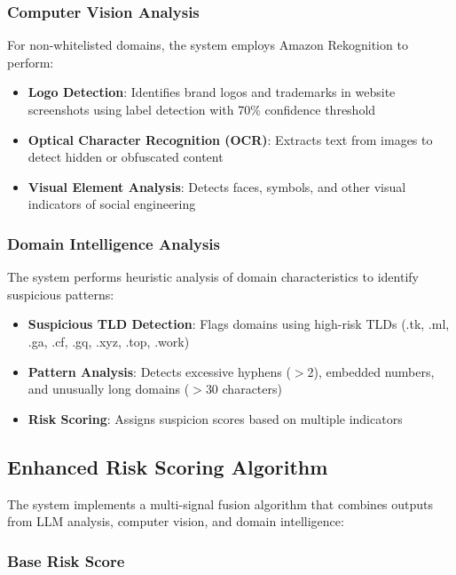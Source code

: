 \documentclass[conference]{IEEEtran}
\begin{document}
\subsubsection{Computer Vision Analysis}

For non-whitelisted domains, the system employs Amazon Rekognition to perform:

\begin{itemize}
\item \textbf{Logo Detection}: Identifies brand logos and trademarks in website screenshots using label detection with 70\% confidence threshold
\item \textbf{Optical Character Recognition (OCR)}: Extracts text from images to detect hidden or obfuscated content
\item \textbf{Visual Element Analysis}: Detects faces, symbols, and other visual indicators of social engineering
\end{itemize}

\subsubsection{Domain Intelligence Analysis}

The system performs heuristic analysis of domain characteristics to identify suspicious patterns:

\begin{itemize}
\item \textbf{Suspicious TLD Detection}: Flags domains using high-risk TLDs (.tk, .ml, .ga, .cf, .gq, .xyz, .top, .work)
\item \textbf{Pattern Analysis}: Detects excessive hyphens ($>$2), embedded numbers, and unusually long domains ($>$30 characters)
\item \textbf{Risk Scoring}: Assigns suspicion scores based on multiple indicators
\end{itemize}


\subsection{Enhanced Risk Scoring Algorithm}

The system implements a multi-signal fusion algorithm that combines outputs from LLM analysis, computer vision, and domain intelligence:

\subsubsection{Base Risk Score}
\end{document}
